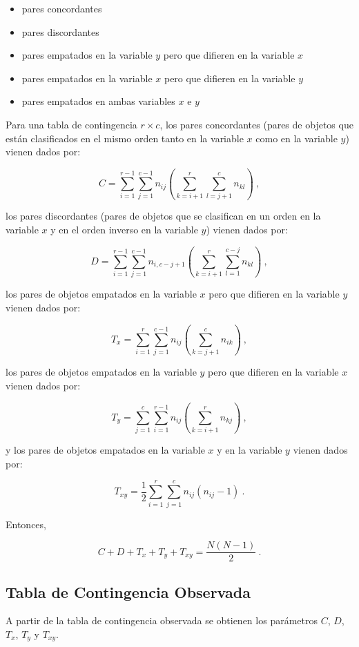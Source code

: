 \documentclass[12pt,a4paper,]{book}
\numberwithin{dummy}{section}
\theoremstyle{ocrenumbox}
\theoremstyle{blacknumex}
\theoremstyle{blacknumbox}
\theoremstyle{ocrenum}
\theoremstyle{ocrenum}
\begin{document}
\begin{itemize}
\item
  pares concordantes
\item
  pares discordantes
\item
  pares empatados en la variable \(y\) pero que difieren en la variable
  \(x\)
\item
  pares empatados en la variable \(x\) pero que difieren en la variable
  \(y\)
\item
  pares empatados en ambas variables \(x\) e \(y\)
\end{itemize}

Para una tabla de contingencia \(r\times c\), los pares concordantes
(pares de objetos que están clasificados en el mismo orden tanto en la
variable \(x\) como en la variable \(y\)) vienen dados por:

\[
C=\sum_{i=1}^{r-1}\sum_{j=1}^{c-1}n_{ij}(\sum_{k=i+1}^r\sum_{l=j+1}^cn_{kl})~,
\]

los pares discordantes (pares de objetos que se clasifican en un orden
en la variable \(x\) y en el orden inverso en la variable \(y\)) vienen
dados por:

\[
D=\sum_{i=1}^{r-1}\sum_{j=1}^{c-1}n_{i,c-j+1}(\sum_{k=i+1}^r\sum_{l=1}^{c-j}n_{kl})~,
\]

los pares de objetos empatados en la variable \(x\) pero que difieren en
la variable \(y\) vienen dados por:

\[
T_x=\sum_{i=1}^{r}\sum_{j=1}^{c-1}n_{ij}(\sum_{k=j+1}^cn_{ik})~,
\]

los pares de objetos empatados en la variable \(y\) pero que difieren en
la variable \(x\) vienen dados por:

\[
T_y=\sum_{j=1}^{c}\sum_{i=1}^{r-1}n_{ij}(\sum_{k=i+1}^rn_{kj})~,
\]

y los pares de objetos empatados en la variable \(x\) y en la variable
\(y\) vienen dados por:

\[
T_{xy}=\frac{1}{2}\sum_{i=1}^{r}\sum_{j=1}^{c}n_{ij}(n_{ij}-1)~.
\]

Entonces,

\[
C+D+T_x+T_y+T_{xy}=\frac{N(N-1)}{2}~.
\]

\hypertarget{tabla-de-contingencia-observada}{%
\subsection{Tabla de Contingencia
Observada}\label{tabla-de-contingencia-observada}}

A partir de la tabla de contingencia observada se obtienen los
parámetros \(C\), \(D\), \(T_x\), \(T_y\) y \(T_{xy}\).
\end{document}
